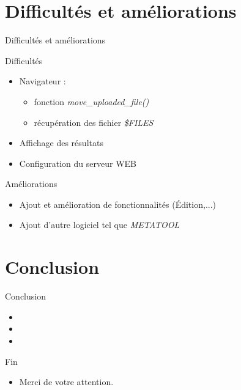 \documentclass{beamer}
\begin{document}
\section{Difficultés et améliorations}

\begin{frame}{\textcolor{bleu2}{\hspace{1cm}Difficultés et améliorations}}
	\begin{block}{Difficultés}
	\begin{itemize}
	\item Navigateur :\begin{itemize}
	\item fonction \emph{move\_uploaded\_file()}
	\item récupération des fichier \emph{\$FILES}
	\end{itemize}
	\item Affichage des résultats
	\item Configuration du serveur WEB
	\end{itemize}
	\end{block}
	
	\begin{block}{Améliorations}
	\begin{itemize}
	\item Ajout et amélioration de fonctionnalités (Édition,...)
	\item Ajout d'autre logiciel tel que \emph{METATOOL}
	\end{itemize}
	\end{block}
\end{frame}

\section{Conclusion}

\begin{frame}{\textcolor{bleu2}{\hspace{1cm}Conclusion}}
	\begin{itemize}
	\item 
	\item 
	\item 
	\end{itemize}
\end{frame}





\begin{frame}{\textcolor{bleu2}{\hspace{1cm}Fin}}
	\begin{itemize}
 		\item Merci de votre attention.   
 	\end{itemize}
\end{frame}
\end{document}
